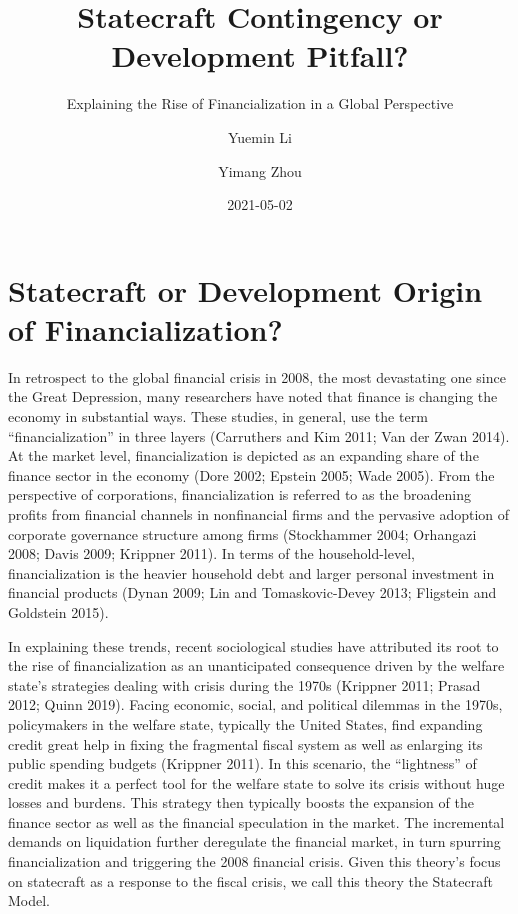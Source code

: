 \documentclass[
]{article}
\title{Statecraft Contingency or Development Pitfall?}
\subtitle{Explaining the Rise of Financialization in a Global Perspective}
\author{Yuemin Li \and Yimang Zhou}
\date{2021-05-02}
\begin{document}
\maketitle

\hypertarget{statecraft-or-development-origin-of-financialization}{%
\section{Statecraft or Development Origin of
Financialization?}\label{statecraft-or-development-origin-of-financialization}}

In retrospect to the global financial crisis in 2008, the most
devastating one since the Great Depression, many researchers have noted
that finance is changing the economy in substantial ways. These studies,
in general, use the term ``financialization'' in three layers
(Carruthers and Kim 2011; Van der Zwan 2014). At the market level,
financialization is depicted as an expanding share of the finance sector
in the economy (Dore 2002; Epstein 2005; Wade 2005). From the
perspective of corporations, financialization is referred to as the
broadening profits from financial channels in nonfinancial firms and the
pervasive adoption of corporate governance structure among firms
(Stockhammer 2004; Orhangazi 2008; Davis 2009; Krippner 2011). In terms
of the household-level, financialization is the heavier household debt
and larger personal investment in financial products (Dynan 2009; Lin
and Tomaskovic-Devey 2013; Fligstein and Goldstein 2015).

In explaining these trends, recent sociological studies have attributed
its root to the rise of financialization as an unanticipated consequence
driven by the welfare state's strategies dealing with crisis during the
1970s (Krippner 2011; Prasad 2012; Quinn 2019). Facing economic, social,
and political dilemmas in the 1970s, policymakers in the welfare state,
typically the United States, find expanding credit great help in fixing
the fragmental fiscal system as well as enlarging its public spending
budgets (Krippner 2011). In this scenario, the ``lightness'' of credit
makes it a perfect tool for the welfare state to solve its crisis
without huge losses and burdens. This strategy then typically boosts the
expansion of the finance sector as well as the financial speculation in
the market. The incremental demands on liquidation further deregulate
the financial market, in turn spurring financialization and triggering
the 2008 financial crisis. Given this theory's focus on statecraft as a
response to the fiscal crisis, we call this theory the Statecraft Model.
\end{document}
